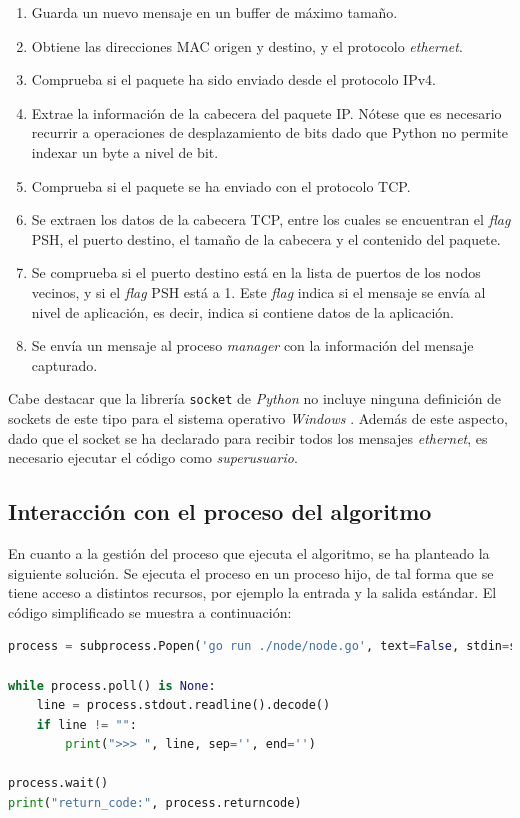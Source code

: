 \begin{enumerate}
\item Guarda un nuevo mensaje en un buffer de máximo tamaño.
\item Obtiene las direcciones MAC origen y destino, y el protocolo \textit{ethernet}.
\item Comprueba si el paquete ha sido enviado desde el protocolo IPv4.
\item Extrae la información de la cabecera del paquete IP. Nótese que es necesario recurrir a operaciones de desplazamiento de bits dado que Python no permite indexar un byte a nivel de bit.
\item Comprueba si el paquete se ha enviado con el protocolo TCP.
\item Se extraen los datos de la cabecera TCP, entre los cuales se encuentran el \textit{flag} PSH, el puerto destino, el tamaño de la cabecera y el contenido del paquete.
\item Se comprueba si el puerto destino está en la lista de puertos de los nodos vecinos, y si el \textit{flag} PSH está a 1. Este \textit{flag} indica si el mensaje se envía al nivel de aplicación, es decir, indica si contiene datos de la aplicación.
\item Se envía un mensaje al proceso \textit{manager} con la información del mensaje capturado.
\end{enumerate}

Cabe destacar que la librería \texttt{socket} de \textit{Python} no incluye ninguna definición de sockets de este tipo para el sistema operativo \textit{Windows} \cite{pythonsocket}. Además de este aspecto, dado que el socket se ha declarado para recibir todos los mensajes \textit{ethernet}, es necesario ejecutar el código como \textit{superusuario}.

\subsection{Interacción con el proceso del algoritmo}

En cuanto a la gestión del proceso que ejecuta el algoritmo, se ha planteado la siguiente solución. Se ejecuta el proceso en un proceso hijo, de tal forma que se tiene acceso a distintos recursos, por ejemplo la entrada y la salida estándar. El código simplificado se muestra a continuación:

\begin{lstlisting}[language=Python]
process = subprocess.Popen('go run ./node/node.go', text=False, stdin=subprocess.PIPE, stdout=subprocess.PIPE, stderr=subprocess.PIPE, universal_newlines=False, shell=True)

while process.poll() is None:
    line = process.stdout.readline().decode()
    if line != "":
        print(">>> ", line, sep='', end='')

process.wait()
print("return_code:", process.returncode)
\end{lstlisting}

